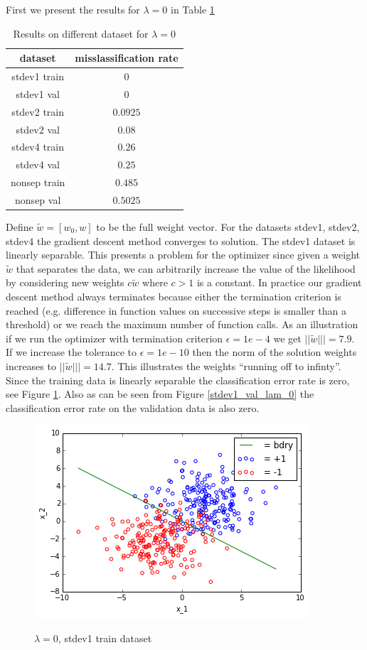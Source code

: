 \documentclass[10pt]{article}
\begin{document}
First we present the results for $\lambda = 0$ in Table \ref{lam_0}
\begin{table}[H]
\begin{tabular}{|c|c|}
\hline
dataset & misslassification rate \\ \hline
stdev1 train & $0$\\ \hline
stdev1 val & $0$\\ \hline
stdev2 train & $0.0925$\\ \hline
stdev2 val & $0.08$\\ \hline
stdev4 train & $0.26$\\ \hline
stdev4 val & $0.25$\\ \hline
nonsep train & $0.485$\\ \hline
nonsep val & $0.5025$\\ \hline
\end{tabular}
\label{lam_0}
\caption{Results on different dataset for $\lambda = 0$}
\end{table}


 Define $\tilde{w} = [w_0,w]$ to be the full weight vector. For the datasets stdev1, stdev2, stdev4 the gradient descent method converges to solution. The stdev1 dataset is linearly separable. This presents a problem for the optimizer since given a weight $\tilde{w}$ that separates the data, we can arbitrarily increase the value of the likelihood by considering new weights $c \tilde{w}$ where $c > 1$ is a constant. In practice our gradient descent method always terminates because either the termination criterion is reached (e.g. difference in function values on successive steps is smaller than a threshold) or we reach the maximum number of function calls. As an illustration if we run the optimizer with termination criterion $\epsilon = 1e-4$ we get $||\tilde{w}||| = 7.9$. If we increase the tolerance to $\epsilon = 1e-10$ then the norm of the solution weights increases to $||\tilde{w}||| = 14.7$. This illustrates the weights ``running off to infinty''. Since the training data is linearly separable the classification error rate is zero, see Figure \ref{stdev1_train_lam_0}. Also as can be seen from Figure \ref{stdev1_val_lam_0} the classification error rate on the validation data is also zero.

\begin{figure}
 \centering
 \includegraphics[scale=0.5]{stdev1_train_lam_0.png}
 \label{stdev1_train_lam_0}
 \caption{$\lambda = 0$, stdev1 train dataset}
 \end{figure}
\end{document}
